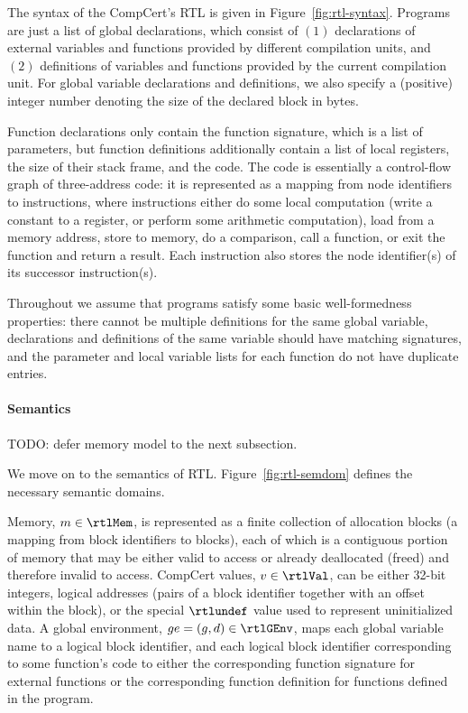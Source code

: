 % 

The syntax of the CompCert's RTL is given in Figure~\ref{fig:rtl-syntax}.  Programs are just a list
of global declarations, which consist of $(1)$ declarations of external variables and functions
provided by different compilation units, and $(2)$ definitions of variables and functions provided
by the current compilation unit.  For global variable declarations and definitions, we also specify
a (positive) integer number denoting the size of the declared block in bytes.

Function declarations only contain the function signature, which is a list of parameters, but
function definitions additionally contain a list of local registers, the size of their stack frame,
and the code.  The code is essentially a control-flow graph of three-address code: it is represented
as a mapping from node identifiers to instructions, where instructions either
%
do some local computation (\eg write a constant to a register, or perform some arithmetic
computation),
%
load from a memory address, 
%
store to memory,
%
do a comparison,
%
call a function, 
%
or exit the function and return a result. 
%
Each instruction also stores the node identifier(s) of its successor instruction(s).

Throughout we assume that programs satisfy some basic well-formedness properties: there cannot be
multiple definitions for the same global variable, declarations and definitions of the same variable
should have matching signatures, and the parameter and local variable lists for each function do not
have duplicate entries.


\paragraph{Semantics}

TODO: defer memory model to the next subsection.

% 

We move on to the semantics of RTL.  Figure~\ref{fig:rtl-semdom} defines the necessary semantic
domains.

Memory, $m\in\rtlMem$, is represented as a finite collection of allocation blocks (a mapping from
block identifiers to blocks), each of which is a contiguous portion of memory that may be either
valid to access or already deallocated (freed) and therefore invalid to access.  CompCert values,
$v\in\rtlVal$, can be either 32-bit integers, logical addresses (pairs of a block identifier
together with an offset within the block), or the special $\rtlundef$ value used to represent
uninitialized data.  A global environment, $ge=(g,d)\in\rtlGEnv$, maps each global variable name to
a logical block identifier, and each logical block identifier corresponding to some function's code
to either the corresponding function signature for external functions or the corresponding function
definition for functions defined in the program.

